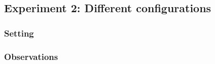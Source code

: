 \documentclass[11pt]{article}
\begin{document}
\subsection{Experiment 2: Different configurations}

\subsubsection{Setting}

\subsubsection{Observations}
\end{document}
